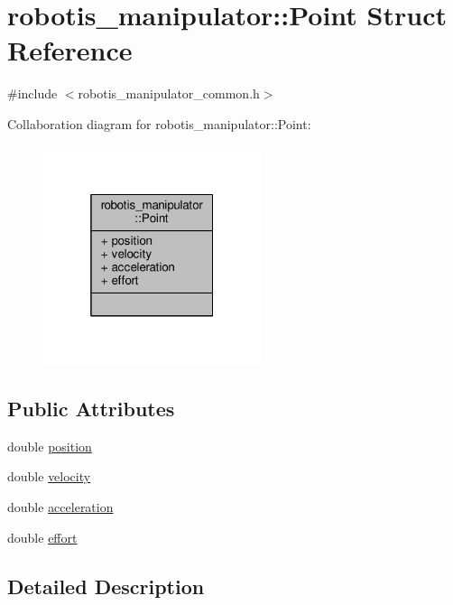 \hypertarget{structrobotis__manipulator_1_1_point}{}\section{robotis\+\_\+manipulator\+:\+:Point Struct Reference}
\label{structrobotis__manipulator_1_1_point}


{\ttfamily \#include $<$robotis\+\_\+manipulator\+\_\+common.\+h$>$}



Collaboration diagram for robotis\+\_\+manipulator\+:\+:Point\+:\nopagebreak
\begin{figure}[H]
\begin{center}
\leavevmode
\includegraphics[width=181pt]{structrobotis__manipulator_1_1_point__coll__graph}
\end{center}
\end{figure}
\subsection*{Public Attributes}
\begin{DoxyCompactItemize}
\item 
double \hyperlink{structrobotis__manipulator_1_1_point_a0f122386b502d9b316bdead542ed2145}{position}
\item 
double \hyperlink{structrobotis__manipulator_1_1_point_a4eaec95fac0c755eb0aa704b36ebe97b}{velocity}
\item 
double \hyperlink{structrobotis__manipulator_1_1_point_adb49f1fbcc0eaa7f530c54fdf0ede836}{acceleration}
\item 
double \hyperlink{structrobotis__manipulator_1_1_point_add1a7019fc87cc2ac9bdf033372a9bb6}{effort}
\end{DoxyCompactItemize}


\subsection{Detailed Description}


